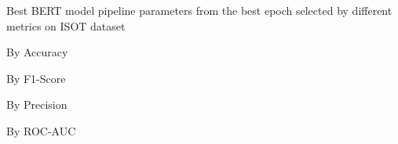 \begin{table}[!htbp]
    \caption{Best BERT model pipeline parameters from the best epoch selected by different metrics on ISOT dataset}
    \label{tab:isot_bert_pipeline_params}
    \centering

    \begin{subtable}[t]{0.48\linewidth}
        \scriptsize
        \caption{By Accuracy}
        
    \end{subtable}
    \hfill
    \begin{subtable}[t]{0.48\linewidth}
        \scriptsize
        \caption{By F1-Score}
        
    \end{subtable}

    \vspace{1em}

    \begin{subtable}[t]{0.48\linewidth}
        \scriptsize
        \caption{By Precision}
        
    \end{subtable}
    \hfill
    \begin{subtable}[t]{0.48\linewidth}
        \scriptsize
        \caption{By ROC-AUC}
        
    \end{subtable}

\end{table}